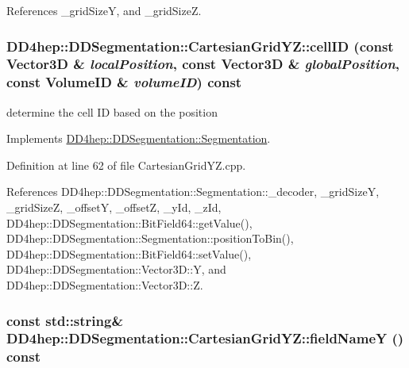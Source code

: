 References \_\-gridSizeY, and \_\-gridSizeZ.\hypertarget{class_d_d4hep_1_1_d_d_segmentation_1_1_cartesian_grid_y_z_a96102e475a228e43a48f75fe2e98f191}{
\subsubsection[{cellID}]{ DD4hep::DDSegmentation::CartesianGridYZ::cellID (const {\bf Vector3D} \& {\em localPosition}, \/  const {\bf Vector3D} \& {\em globalPosition}, \/  const {\bf VolumeID} \& {\em volumeID}) const}}
\label{class_d_d4hep_1_1_d_d_segmentation_1_1_cartesian_grid_y_z_a96102e475a228e43a48f75fe2e98f191}


determine the cell ID based on the position 

Implements \hyperlink{class_d_d4hep_1_1_d_d_segmentation_1_1_segmentation_ad5a60953d96d409850d8192f64f8ce3c}{DD4hep::DDSegmentation::Segmentation}.

Definition at line 62 of file CartesianGridYZ.cpp.

References DD4hep::DDSegmentation::Segmentation::\_\-decoder, \_\-gridSizeY, \_\-gridSizeZ, \_\-offsetY, \_\-offsetZ, \_\-yId, \_\-zId, DD4hep::DDSegmentation::BitField64::getValue(), DD4hep::DDSegmentation::Segmentation::positionToBin(), DD4hep::DDSegmentation::BitField64::setValue(), DD4hep::DDSegmentation::Vector3D::Y, and DD4hep::DDSegmentation::Vector3D::Z.\hypertarget{class_d_d4hep_1_1_d_d_segmentation_1_1_cartesian_grid_y_z_a93cbfb2eb17360ed72480d24367b4bc8}{
\subsubsection[{fieldNameY}]{\setlength{\rightskip}{0pt plus 5cm}const std::string\& DD4hep::DDSegmentation::CartesianGridYZ::fieldNameY () const}}
\label{class_d_d4hep_1_1_d_d_segmentation_1_1_cartesian_grid_y_z_a93cbfb2eb17360ed72480d24367b4bc8}


